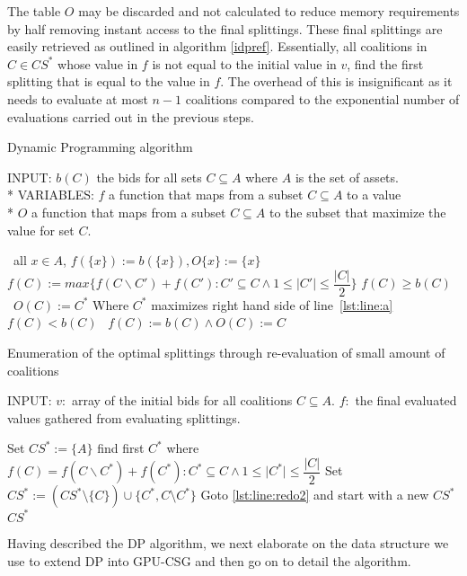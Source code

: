 \documentclass[a4paper, 12pt]{report}
\begin{document}
The table $O$ may be discarded and not calculated to reduce memory requirements
by half removing instant access to the final splittings. These final splittings
are easily retrieved as outlined in algorithm \ref{idpref}.  Essentially, all
coalitions in $C \in CS^*$ whose value in $f$ is not equal to the initial value
in $v$, find the first splitting that is equal to the value in $f$. The overhead
of this is insignificant as it needs to evaluate at most $n -1$ coalitions
compared to the exponential
number of evaluations carried out in the previous steps\cite{eps265062}.

\begin{algorithm}
\caption{Dynamic Programming algorithm \label{DP}}
INPUT: $b(C)$ the bids for all sets $C \subseteq A$ where $A$ is the set of
assets.\\*
VARIABLES: $f$ a function that maps from a subset $C \subseteq A$ to a value\\*
$O$ a function that maps from a subset $C \subseteq A$ to the subset that
maximize the value for set $C$.
\begin{algorithmic}[1]
\STATE\algorithmicfor\ all $x \in A$, \algorithmicdo $f(\{x\}):=
b(\{x\}),O\{x\}:= \{x\}$ \algorithmicendfor
{}
\STATE $f(C) := max\{f(C\backslash C')+f(C'):C'\subseteq C \wedge 1 \leq \vert
C' \vert \leq \dfrac{\vert C \vert}{2}\}$ \label{lst:line:a}
\STATE\algorithmicif $f(C) \geq b(C)$ \algorithmicthen\ $O(C) := C^{*}$ \hfill
Where $C^{*}$ maximizes right hand side of line~\ref{lst:line:a}
\algorithmicendif
\STATE\algorithmicif $f(C) < b(C)$ \algorithmicthen\ $f(C) := b(C)\wedge O(C) :=
C$ \algorithmicendif
\ENDFOR
\ENDFOR
\end{algorithmic}
\end{algorithm}


\begin{algorithm}
\caption{Enumeration of the optimal splittings through re-evaluation of small
amount of coalitions \label{idpref}}
INPUT: $v:$ array of the initial bids for all coalitions $C \subseteq A$. 
$f:$ the final evaluated values gathered from evaluating splittings.
\begin{algorithmic}[1]
\STATE Set $CS^* := \{A\}$
 \label{lst:line:redo2}
\STATE find first $C^*$ where $f(C) = f(C\backslash C^*)+f(C^*):C^*\subseteq C
\wedge 1 \leq \vert C^* \vert \leq \dfrac{\vert C \vert}{2}$ \label{lst:line:aa}
\STATE Set $CS^* := (CS^*\setminus \{C\})\cup \{C^*,C\setminus C^*\}$
\STATE Goto \ref{lst:line:redo2} and start with a new $CS^*$
\ENDIF
\ENDFOR
\RETURN $CS^*$
\end{algorithmic}
\end{algorithm}
Having described the DP algorithm, we next elaborate on the data structure we
use to extend DP into GPU-CSG and then go on to detail the algorithm.
\end{document}
